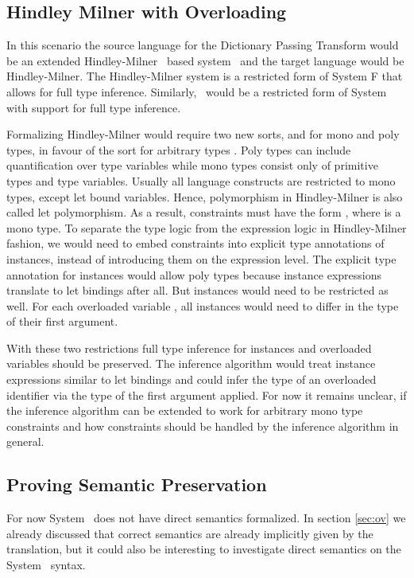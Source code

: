 \subsection{Hindley Milner with Overloading}\label{sec:hm}
In this scenario the source language for the Dictionary Passing Transform would be an extended Hindley-Milner~\cite{hm} based system \HMo\ and the target language would be Hindley-Milner. 
The Hindley-Milner system is a restricted form of System F that allows for full type inference. Similarly, \HMo\ would be a restricted form of System \Fo with support for full type inference. 

\noindent Formalizing Hindley-Milner would require two new sorts,  and  for mono and poly types, in favour of the sort for arbitrary types . 
Poly types can include quantification over type variables while mono types consist only of primitive types and type variables. 
Usually all language constructs are restricted to mono types, except let bound variables. 
Hence, polymorphism in Hindley-Milner is also called let polymorphism.  
As a result, constraints must have the form  \Constr{:} , where  is a mono type. 
To separate the type logic from the expression logic in Hindley-Milner fashion, we would need to embed constraints into explicit type annotations of instances, instead of introducing them on the expression level. 
The explicit type annotation for instances would allow poly types because instance expressions translate to let bindings after all.
But instances would need to be restricted as well. 
For each overloaded variable , all instances would need to differ in the type of their first argument.

\noindent With these two restrictions full type inference for instances and overloaded variables should be preserved.
The inference algorithm would treat instance expressions similar to let bindings and could infer the type of an overloaded identifier via the type of the first argument applied. 
For now it remains unclear, if the inference algorithm can be extended to work for arbitrary mono type constraints and how constraints should be handled by the inference algorithm in general.

\subsection{Proving Semantic Preservation}
For now System \Fo\ does not have direct semantics formalized. In section \ref{sec:ov} we already discussed that correct semantics are already implicitly given by the translation, but it could also be interesting to investigate direct semantics on the System \Fo\ syntax.

